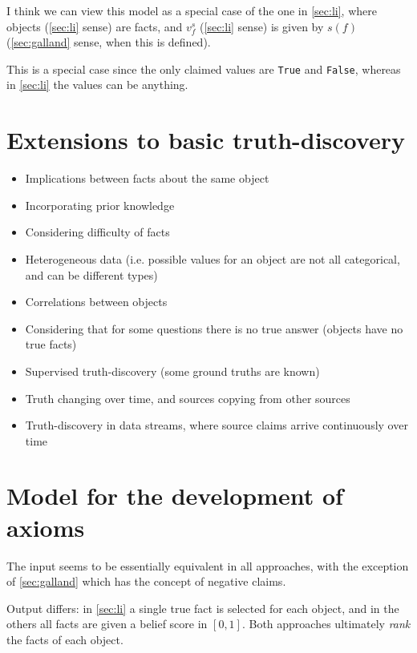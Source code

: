 \documentclass{article}
\theoremstyle{definition}
\theoremstyle{plain}
\theoremstyle{remark}
\begin{document}
I think we can view this model as a special case of the one in \ref{sec:li},
where objects (\ref{sec:li} sense) are facts, and $v_f^s$ (\ref{sec:li} sense)
is given by $s(f)$ (\ref{sec:galland} sense, when this is defined).

This is a special case since the only claimed values are \texttt{True} and
\texttt{False}, whereas in \ref{sec:li} the values can be anything.

\section{Extensions to basic truth-discovery}
\begin{itemize}

\item Implications between facts about the same object{\cite{yin_han_yu}}
\item Incorporating prior knowledge{\cite{pasternack}}
\item Considering difficulty of facts{\cite{galland}}
\item Heterogeneous data (i.e. possible values for an object are not all
categorical, and can be different types){\cite{li_conflicts}}
\item Correlations between objects{\cite{yang}}
\item Considering that for some questions there is no true answer (objects have
no true facts){\cite{zhi}}
\item Supervised truth-discovery (some ground truths are
known){\cite{yin_supervised}}
\item Truth changing over time, and sources copying from other
sources{\cite{dong}}
\item Truth-discovery in data streams, where source claims arrive continuously
over time{\cite{zhao}}

\end{itemize}

\section{Model for the development of axioms}

The input seems to be essentially equivalent in all approaches, with the
exception of \ref{sec:galland} which has the concept of negative claims.

Output differs: in \ref{sec:li} a single true fact is selected for each object,
and in the others all facts are given a belief score in $[0, 1]$. Both
approaches ultimately \emph{rank} the facts of each object.
\end{document}
